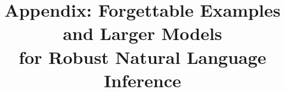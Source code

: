 \documentclass[11pt,a4paper]{article}
\title{Appendix: Forgettable Examples and Larger Models \\ for Robust Natural Language Inference}
\begin{document}
\appendix
\label{sec:detailedresults}


\end{document}
